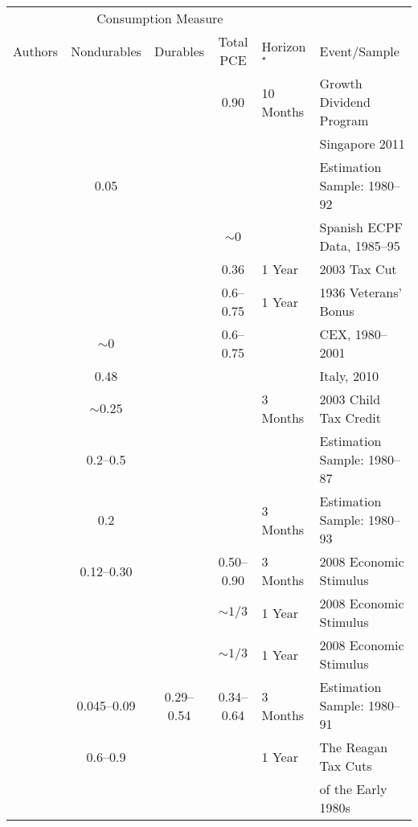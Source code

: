 
\begin{center}
\begin{tabular}{lcccll}
\toprule
&  \multicolumn{3}{c}{Consumption Measure}&&\\
\cmidrule(r){2-4}
Authors & \multicolumn{1}{c}{Nondurables} & \multicolumn{1}{c}{Durables} & \multicolumn{1}{c}{Total PCE}& Horizon$^\star$& Event/Sample \\
\midrule
\text{\citet{agarwalQuianSingaporeMPC}} & & & 0.90 & 10 Months & Growth Dividend Program \\
 & & & & & Singapore 2011\\
\text{\citet{bppInequality}$^\ddagger$} & 0.05& &  & & Estimation Sample: 1980--92\\
\text{\citet{browningCollado:AntIncChanges}} & & & \multicolumn{1}{c}{$\sim0$} && Spanish ECPF Data, 1985--95\\
\text{\citet{coronadoEtAl}} & & & \multicolumn{1}{c}{0.36} & 1 Year&2003 Tax Cut\\
\text{\citet{hausmanVeteransBonus}} & & &  \multicolumn{1}{c}{0.6--0.75} & 1 Year & 1936 Veterans' Bonus\\
\text{\citet{hsieh:alaska}$^\ddagger$} & \multicolumn{1}{c}{$\sim0$} & &  \multicolumn{1}{c}{0.6--0.75} &  & CEX, 1980--2001\\
\text{\citet{jappelliPistaferri_FPMPC}} & \multicolumn{1}{c}{0.48} & & & & Italy, 2010 \\
\text{\citet{johnsonEtAl:2003childTaxCredit}} & \multicolumn{1}{c}{$\sim0.25$} & & & 3 Months & 2003 Child Tax Credit \\
\text{\citet{lusardi}$^\ddagger$}& \multicolumn{1}{c}{0.2--0.5} & & & & Estimation Sample: 1980--87\\
\text{\citet{parkerSocSec}} & 0.2 & & & 3 Months & Estimation Sample: 1980--93\\
\text{\citet{psjmStim}}& \multicolumn{1}{c}{0.12--0.30} & & \multicolumn{1}{c}{0.50--0.90} & 3 Months &2008 Economic Stimulus \\
\text{\citet{Sahmetal:2008TaxRebates}}&  & & \multicolumn{1}{c}{$\sim1/3$} & 1 Year &2008 Economic Stimulus \\
\text{\citet{ssBang}} & & & \multicolumn{1}{c}{$\sim1/3$} & 1 Year & 2008 Economic Stimulus \\
\text{\citet{souleles:taxrefunds}} & \multicolumn{1}{c}{0.045--0.09} & \multicolumn{1}{c}{0.29--0.54} & \multicolumn{1}{c}{0.34--0.64} & 3 Months &Estimation Sample: 1980--91\\
\text{\citet{souleles:responseToReaganCuts}} & \multicolumn{1}{c}{0.6--0.9} & & & 1 Year &The Reagan Tax Cuts \\
& & & & & of the Early 1980s\\
\bottomrule
\end{tabular}

\end{center}
